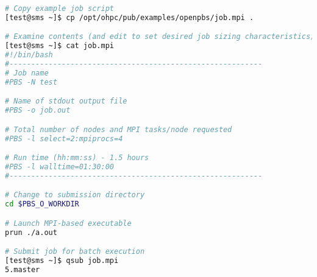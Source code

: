 \begin{lstlisting}[language=bash,keywords={}]
# Copy example job script
[test@sms ~]$ cp /opt/ohpc/pub/examples/openpbs/job.mpi .

# Examine contents (and edit to set desired job sizing characteristics)
[test@sms ~]$ cat job.mpi
#!/bin/bash
#----------------------------------------------------------
# Job name
#PBS -N test

# Name of stdout output file
#PBS -o job.out

# Total number of nodes and MPI tasks/node requested
#PBS -l select=2:mpiprocs=4

# Run time (hh:mm:ss) - 1.5 hours
#PBS -l walltime=01:30:00
#----------------------------------------------------------

# Change to submission directory
cd $PBS_O_WORKDIR

# Launch MPI-based executable
prun ./a.out

# Submit job for batch execution
[test@sms ~]$ qsub job.mpi
5.master

\end{lstlisting}
